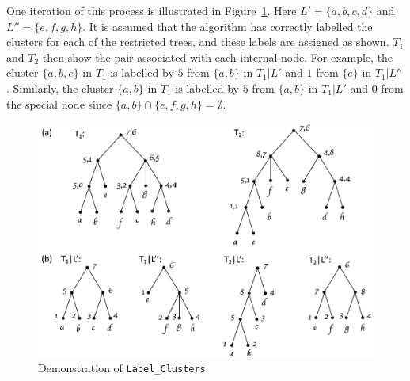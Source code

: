 \documentclass{article}
\begin{document}
    One iteration of this process is illustrated in Figure~\ref{fig:labelclusters}. Here $L' = \{a, b, c, d\}$ and $L'' = \{e, f, g, h\}$. It is assumed that the algorithm has correctly labelled the clusters for each of the restricted trees, and these labels are assigned as shown. $T_1$ and $T_2$ then show the pair associated with each internal node. For example, the cluster $\{a, b, e\}$ in $T_1$ is labelled by $5$ from $\{a, b\}$ in $T_1|L'$ and $1$ from $\{e\}$ in $T_1|L''$. Similarly, the cluster $\{a, b\}$ in $T_1$ is labelled by $5$ from $\{a, b\}$ in $T_1|L'$ and $0$ from the special node since $\{a, b\} \cap \{e, f, g, h\} = \emptyset$.

    \begin{figure}[h]
        \includegraphics[scale=0.5]{labelclusters}
        \centering
        \caption{Demonstration of \texttt{Label\_Clusters}}
        \label{fig:labelclusters}
    \end{figure}
\end{document}
